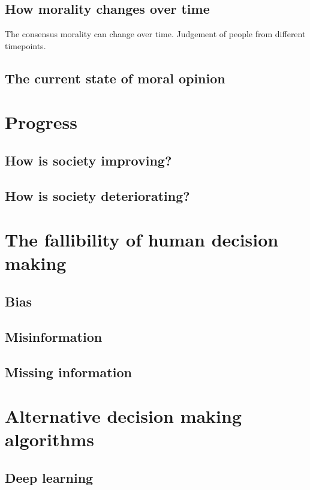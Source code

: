 \subsection{How morality changes over time}
The consensus morality can change over time.
Judgement of people from different timepoints.

\subsection{The current state of moral opinion}

\section{Progress}
\subsection{How is society improving?}

\subsection{How is society deteriorating?}

\section{The fallibility of human decision making}
\subsection{Bias}
\subsection{Misinformation}
\subsection{Missing information}

\section{Alternative decision making algorithms}
\subsection{Deep learning}
